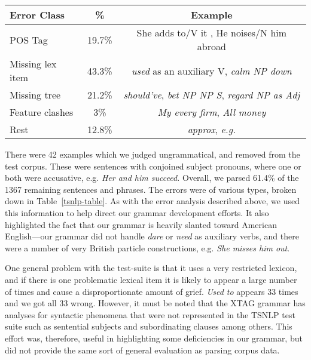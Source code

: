 \begin{table*}[htb] 
\centering 
\begin{tabular}{|l|c|c|} 
\hline 
Error Class & \% & Example \\ \hline 
POS Tag &  19.7\% & She adds  to/V it , He noises/N him abroad \\ \hline 
Missing lex item & 43.3\% & {\it used} as an auxiliary V, {\it calm NP down} \\ \hline 
Missing tree & 21.2\% & {\it should've}, {\it bet NP NP S}, {\it regard NP as Adj} \\ \hline 
Feature clashes & 3\% & {\it My every firm}, {\it All money} \\ \hline 
Rest&12.8\% & {\it approx}, {\it e.g.} \\ 
\hline 
\end{tabular} 
\begin{rawhtml} <dl> <dt>{Breakdown of TSNLP Errors <p> </dl> \end{rawhtml}
\label{tsnlp-table} 
\end{table*} 
 
There were 42 examples which we judged ungrammatical, and removed from 
the test corpus. These were sentences with conjoined subject pronouns, 
where one or both were accusative, e.g. {\it Her and him succeed.} 
Overall, we parsed 61.4\% of the 1367 remaining sentences and 
phrases. The errors were of various types, broken down in 
Table~\ref{tsnlp-table}. As with the error analysis described above, 
we used this information to help direct our grammar development 
efforts. It also highlighted the fact 
that our grammar is heavily slanted toward American English---our 
grammar did not handle {\it dare} or {\it need} as auxiliary verbs, 
and there were a number of very British particle constructions, 
e.g. {\it She misses him out}. 
 
One general problem with the test-suite is that it uses a very 
restricted lexicon, and if there is one problematic lexical item it is 
likely to appear a large number of times and cause a disproportionate 
amount of grief. {\it Used to} appears 33 times and we got all 33 
wrong. However, it must be noted that the XTAG grammar has analyses 
for syntactic phenomena that were not represented in the TSNLP test 
suite such as sentential subjects and subordinating clauses among 
others. This effort was, therefore, useful in highlighting some 
deficiencies in our grammar, but did not provide the same sort of 
general evaluation as parsing corpus data. 
 
